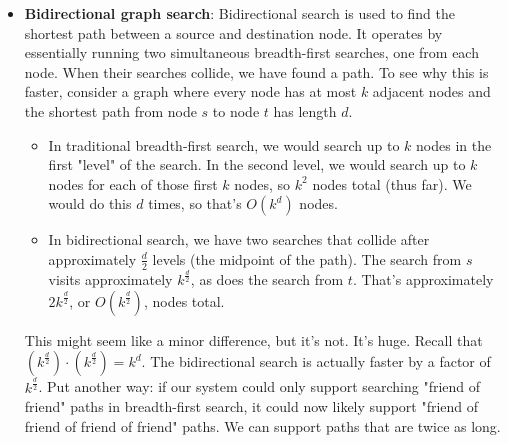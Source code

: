 \documentclass{report}
\begin{document}
\begin{itemize}
            \bigbreak \noindent 
            \bigbreak \noindent 
            Very commonly, a trie is used to store the entire (English) language for quick prefix lookups. While a hash table can quickly look up whether a string is a valid word, it cannot tell us if a string is a prefix of any valid words. A trie can do this very quickly.
            \bigbreak \noindent 
            How quickly? A trie can check if a string is a valid prefix in $O(K)$ time, where $K$ is the length of the string. This is actually the same runtime as a hash table will take. Although we often refer to hash table lookups as being $O(1)$ time, this isn't entirely true. A hash table must read through all the characters in the input, which takes $O( K)$ time in the case of a word lookup.
            \bigbreak \noindent 
            Many problems involving lists of valid words leverage a trie as an optimization. In situations when we search through the tree on related prefixes repeatedly (e.g., looking up M, then MA, then MAN, then MANY), we might pass around a reference to the current node in the tree. This will allow us to just check if Y is a child of MAN, rather than starting from the root each time.
        \item \textbf{Bidirectional graph search}: Bidirectional search is used to find the shortest path between a source and destination node. It operates by essentially running two simultaneous breadth-first searches, one from each node. When their searches collide, we have found a path.
            \bigbreak \noindent 
            \bigbreak \noindent 
            To see why this is faster, consider a graph where every node has at most $k$ adjacent nodes and the shortest path from node $s$ to node $t$ has length $d$.
            \begin{itemize}
                \item In traditional breadth-first search, we would search up to $k$ nodes in the first "level" of the search. In the second level, we would search up to $k$ nodes for each of those first $k$ nodes, so $k^{2}$ nodes total (thus far). We would do this $d$ times, so that's $O(k^{d})$ nodes.
                    \bigbreak \noindent 
                \item In bidirectional search, we have two searches that collide after approximately $\frac{d}{2}$ levels (the midpoint of the path). The search from $s$ visits approximately $k^{\frac{d}{2}}$, as does the search from $t$. That's approximately $2 k^{\frac{d}{2}}$, or $O(k^{\frac{d}{2}})$, nodes total.
            \end{itemize}
            This might seem like a minor difference, but it's not. It's huge. Recall that $(k^{\frac{d}{2}})\cdot  (k^{\frac{d}{2}}) = k^{d}$. The bidirectional search is actually faster by a factor of $k^{\frac{d}{2}} $.
            \bigbreak \noindent 
            Put another way: if our system could only support searching "friend of friend" paths in breadth-first search, it could now likely support "friend of friend of friend of friend" paths. We can support paths that are twice as long.




\end{itemize}
\end{document}
